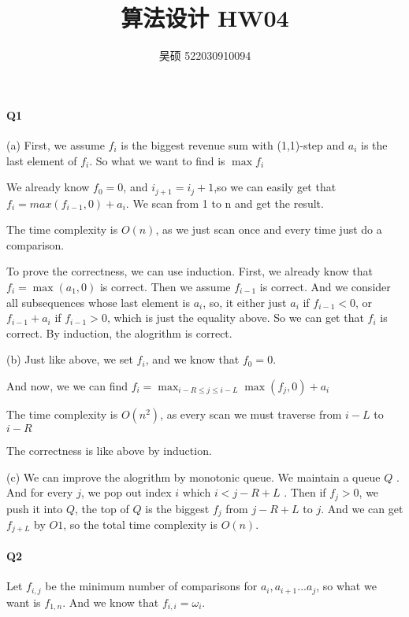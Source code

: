 \documentclass[UTF8]{ctexart}
\renewcommand{\(}{\left(}
\renewcommand{\)}{\right)}
\begin{document}
\title{算法设计 HW04}  
\author{吴硕 522030910094}
\maketitle

\paragraph{Q1} 

(a) First, we assume $f_{i}$ is the biggest revenue sum with (1,1)-step and $a_{i}$ is the last
element of $f_{i}$. So what we want to find is $\max{f_{i}}$

We already know $f_{0} = 0$, and $i_{j+1} = i_{j} + 1$,so we can easily get that 
$f_{i} = max(f_{i-1},0) + a_{i}$. We scan from 1 to n and get the result.

The time complexity is $O(n)$, as we just scan once and every time just do a comparison.

To prove the correctness, we can use induction. First, we already know that $f_{i} = \max(a_{1}, 0)$ is correct. 
Then we assume $f_{i-1}$ is correct. And we consider all subsequences whose last element is $a_{i}$,
so, it either just $a_{i}$ if $f_{i-1} < 0$, or $f_{i-1} + a_{i}$ if $f_{i-1} > 0$, which 
is just the equality above. So we can get that $f_{i}$ is correct.
By induction, the alogrithm is correct.

(b) Just like above, we set $f_{i}$, and we know that $f_{0} = 0$.

And now, we we can find $f_{i} = \max_{i-R \leq j \leq i-L}{\max(f_{j},0) + a_i}$ 

The time complexity is $O(n^{2})$, as every scan we must traverse from $i-L$ to $i-R$

The correctness is like above by induction. 

(c) We can improve the alogrithm by monotonic queue. We maintain a queue $Q$ . 
And for every $j$, we pop out index $i$ which $i < j - R + L$ .
Then if $f_{j} > 0$, we push it into $Q$, the top of $Q$ is the biggest $f_{j}$ from $j-R+L$ to $j$.
And we can get $f_{j+L}$ by $O{1}$, so the total time complexity is $O(n)$.

\paragraph{Q2} 
Let $f_{i,j}$ be the minimum number of comparisons for $a_{i}, a_{i+1} ... a_{j}$, so what we want
is $f_{1,n}$. And we know that $f_{i,i} = \omega _{i}$.
\end{document}
